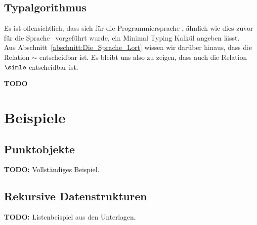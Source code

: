 \subsection{Typalgorithmus}

Es ist offensichtlich, dass sich f\"ur die Programmiersprache \Losrt, \"ahnlich wie dies zuvor f\"ur die
Sprache \Losub\ vorgef\"uhrt wurde, ein Minimal Typing Kalk\"ul angeben l\"asst. Aus Abschnitt~\ref{abschnitt:Die_Sprache_Lort}
wissen wir dar\"uber hinaus, dass die Relation $\sim$ entscheidbar ist. Es bleibt uns also zu zeigen, dass
auch die Relation $\simle$ entscheidbar ist.

{\bf TODO}



\section{Beispiele}

\subsection{Punktobjekte}

{\bf TODO:} Vollst\"andiges Beispiel.

\subsection{Rekursive Datenstrukturen}

{\bf TODO:} Listenbeispiel aus den Unterlagen.


